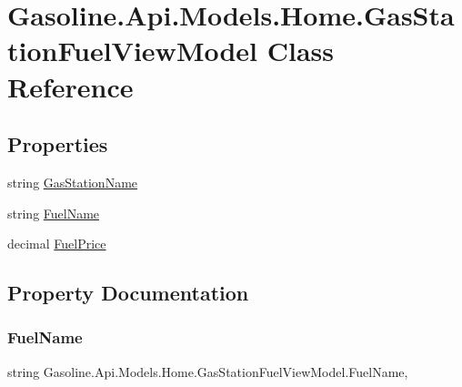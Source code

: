 \hypertarget{class_gasoline_1_1_api_1_1_models_1_1_home_1_1_gas_station_fuel_view_model}{}\section{Gasoline.\+Api.\+Models.\+Home.\+Gas\+Station\+Fuel\+View\+Model Class Reference}
\label{class_gasoline_1_1_api_1_1_models_1_1_home_1_1_gas_station_fuel_view_model}
\subsection*{Properties}
\begin{DoxyCompactItemize}
\item 
string \mbox{\hyperlink{class_gasoline_1_1_api_1_1_models_1_1_home_1_1_gas_station_fuel_view_model_a3d865e1ea95259a822547ca6c89e351f}{Gas\+Station\+Name}}
\item 
string \mbox{\hyperlink{class_gasoline_1_1_api_1_1_models_1_1_home_1_1_gas_station_fuel_view_model_a2ca0a66681afea94970e7c1e2151a7de}{Fuel\+Name}}
\item 
decimal \mbox{\hyperlink{class_gasoline_1_1_api_1_1_models_1_1_home_1_1_gas_station_fuel_view_model_a23c1e3b2d14db026a65fe4edc5803e11}{Fuel\+Price}}
\end{DoxyCompactItemize}


\subsection{Property Documentation}
\mbox{\label{class_gasoline_1_1_api_1_1_models_1_1_home_1_1_gas_station_fuel_view_model_a2ca0a66681afea94970e7c1e2151a7de}} 
\subsubsection{\texorpdfstring{FuelName}{FuelName}}
{\footnotesize\ttfamily string Gasoline.\+Api.\+Models.\+Home.\+Gas\+Station\+Fuel\+View\+Model.\+Fuel\+Name\hspace{0.3cm}{\ttfamily [get]}, {\ttfamily [set]}}

